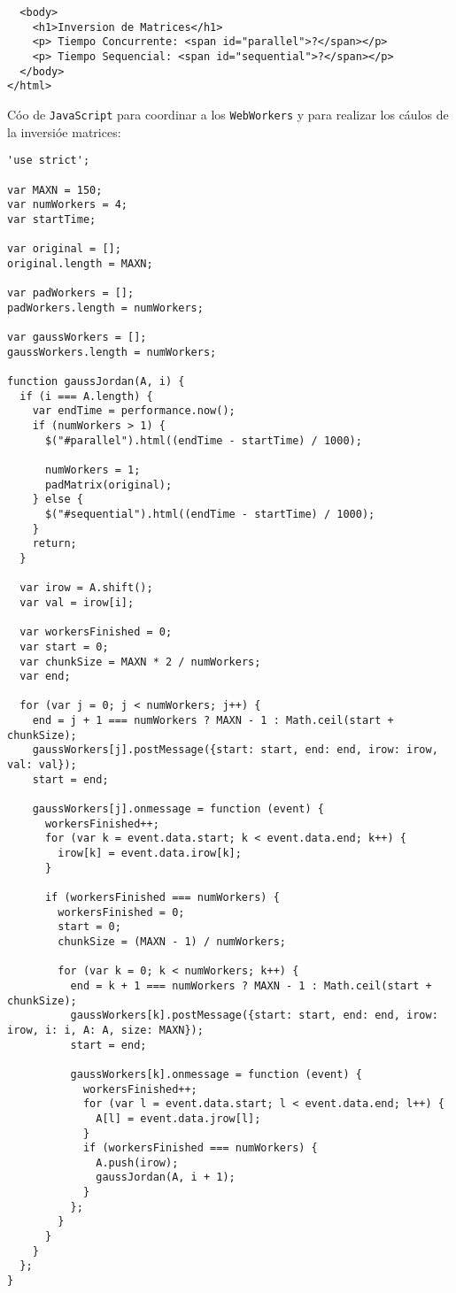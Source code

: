 \documentclass[10pt,letterpaper,oneside]{article}
\begin{document}
{\begin{verbatim}
  <body>
    <h1>Inversion de Matrices</h1>
    <p> Tiempo Concurrente: <span id="parallel">?</span></p>
    <p> Tiempo Sequencial: <span id="sequential">?</span></p>
  </body>
</html>
\end{verbatim}

Cóo de \verb!JavaScript! para coordinar a los \verb!WebWorkers! y para realizar los cáulos de la inversióe matrices:
\begin{verbatim}
'use strict';

var MAXN = 150;
var numWorkers = 4;
var startTime;

var original = [];
original.length = MAXN;

var padWorkers = [];
padWorkers.length = numWorkers;

var gaussWorkers = [];
gaussWorkers.length = numWorkers;

function gaussJordan(A, i) {
  if (i === A.length) {
    var endTime = performance.now();
    if (numWorkers > 1) {
      $("#parallel").html((endTime - startTime) / 1000);

      numWorkers = 1;
      padMatrix(original);
    } else {
      $("#sequential").html((endTime - startTime) / 1000);
    }
    return;
  }

  var irow = A.shift();
  var val = irow[i];

  var workersFinished = 0;
  var start = 0;
  var chunkSize = MAXN * 2 / numWorkers;
  var end;

  for (var j = 0; j < numWorkers; j++) {
    end = j + 1 === numWorkers ? MAXN - 1 : Math.ceil(start + chunkSize);
    gaussWorkers[j].postMessage({start: start, end: end, irow: irow, val: val});
    start = end;

    gaussWorkers[j].onmessage = function (event) {
      workersFinished++;
      for (var k = event.data.start; k < event.data.end; k++) {
        irow[k] = event.data.irow[k];
      }

      if (workersFinished === numWorkers) {
        workersFinished = 0;
        start = 0;
        chunkSize = (MAXN - 1) / numWorkers;

        for (var k = 0; k < numWorkers; k++) {
          end = k + 1 === numWorkers ? MAXN - 1 : Math.ceil(start + chunkSize);
          gaussWorkers[k].postMessage({start: start, end: end, irow: irow, i: i, A: A, size: MAXN});
          start = end;

          gaussWorkers[k].onmessage = function (event) {
            workersFinished++;
            for (var l = event.data.start; l < event.data.end; l++) {
              A[l] = event.data.jrow[l];
            }
            if (workersFinished === numWorkers) {
              A.push(irow);
              gaussJordan(A, i + 1);
            }
          };
        }
      }
    }
  };
}


\end{verbatim}}
\end{document}
